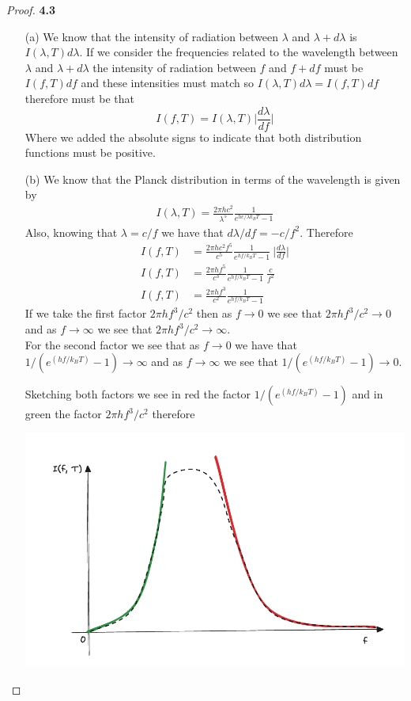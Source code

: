 \documentclass[11pt]{article}
\theoremstyle{definition}
\begin{document}
\begin{proof}{\textbf{4.3}}
\begin{itemize}
    \item [(a)] We know that the intensity of radiation between $\lambda$
    and $\lambda + d\lambda$ is $I(\lambda, T)d\lambda$.
    If we consider the frequencies related to the wavelength between $\lambda$
    and $\lambda + d\lambda$ the intensity of radiation between $f$ and
    $f + df$ must be $I(f, T)df$ and these intensities must match so
    $I(\lambda, T)d\lambda = I(f, T)df$ therefore must be that
    $$I(f,T) = I(\lambda,T) \bigg|\frac{d\lambda}{df}\bigg|$$
    Where we added the absolute signs to indicate that both distribution
    functions must be positive.
\cleardoublepage
    \item [(b)] We know that the Planck distribution in terms of the wavelength
    is given by
    \begin{align*}
        I(\lambda, T) = \frac{2\pi h c^2}{\lambda^5}
        \frac{1}{e^{hc/\lambda k_B T} - 1}
    \end{align*}
    Also, knowing that $\lambda = c/f$ we have that $d\lambda/df = - c/f^2$.
    Therefore
    \begin{align*}
        I(f, T) &= \frac{2\pi h c^2 f^5}{c^5}
        \frac{1}{e^{hf/k_B T} - 1}~\bigg|\frac{d\lambda}{df}\bigg|\\
        I(f, T) &= \frac{2\pi h f^5}{c^3}
        \frac{1}{e^{hf/k_B T} - 1}~\frac{c}{f^2}\\
        I(f, T) &= \frac{2\pi h f^3}{c^2}
        \frac{1}{e^{hf/k_B T} - 1}
    \end{align*}
    If we take the first factor $2\pi hf^3/c^2$ then as $f \to 0$
    we see that $2\pi hf^3/c^2 \to 0$ and as $f \to \infty$
    we see that $2\pi hf^3/c^2 \to \infty$.\\
    For the second factor we see that as $f \to 0$ we have that
    $1/(e^{(hf/ k_B T)} - 1) \to \infty$ and as $f \to \infty$
    we see that $1/(e^{(hf/ k_B T)} - 1) \to 0$.

    Sketching both factors we see in red the factor 
    $1/(e^{(hf/k_B T)} - 1)$ and in green the factor $2\pi hf^3/c^2$ therefore
    \begin{center}
        \includegraphics[scale=0.4]{ch4-3.png}
    \end{center}
\end{itemize}
\end{proof}
\end{document}
